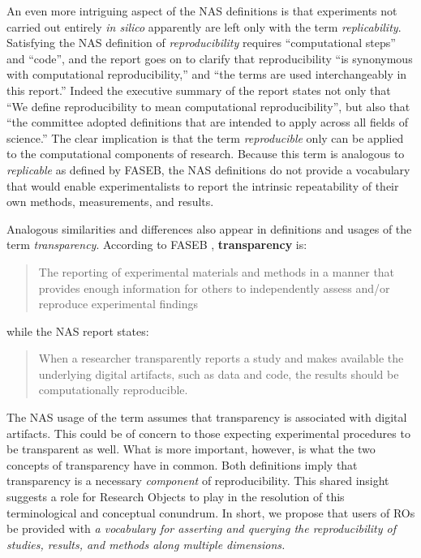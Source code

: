  An even more intriguing aspect of the NAS definitions \cite{committeeonreproducibilityandreplicabilityinscience2019reproducibility}
	is that experiments not carried out
	entirely \emph{in silico} apparently are left only with the term \emph{replicability}.
Satisfying the NAS definition of \emph{reproducibility} requires
	``computational steps'' and ``code'', and the report goes on to clarify
	that reproducibility ``is synonymous with computational reproducibility,''  and ``the terms are used interchangeably in this report.''
Indeed the executive summary of the report states not only that ``We define reproducibility to mean computational reproducibility'',
	but also that ``the committee adopted definitions that are intended to apply across all fields of science.''
The clear implication is that the term \emph{reproducible} only can be applied to the computational components of research.
Because this term is analogous to \emph{replicable} as defined by FASEB, the NAS definitions do not provide a vocabulary
	that would enable experimentalists to report the intrinsic repeatability of their own methods, measurements, and results.

Analogous similarities and differences also appear in definitions and usages of the term \emph{transparency}.
According to FASEB \cite{FASEB2016enhancing}, \textbf{transparency} is:
\begin{quote}
	The reporting of experimental materials and methods in a manner that provides enough information
	for others to independently assess and/or reproduce experimental findings
      \end{quote}
while the NAS report \cite{committeeonreproducibilityandreplicabilityinscience2019reproducibility} states:
 \begin{quote}
	When a researcher transparently reports a study and makes available the underlying digital artifacts, such as data and code,
	the results should be computationally reproducible.
      \end{quote}

\noindent The NAS usage of the term assumes that transparency is associated with digital artifacts.
This could be of concern to those expecting experimental procedures to be transparent as well.
What is more important, however, is what the two concepts of transparency have in common.
Both definitions imply that transparency is a necessary \emph{component} of reproducibility.
This shared insight suggests a role for Research Objects to play in the resolution of this
    terminological and conceptual conundrum.
In short, we propose that users of ROs be provided with \emph{a vocabulary for asserting and querying the reproducibility
          of studies, results, and methods along multiple dimensions.}

